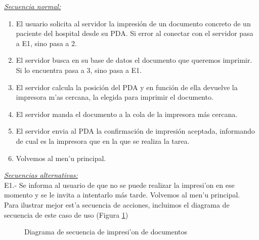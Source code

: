 \emph{\underline{Secuencia normal:}} 
\begin{enumerate}
\item El usuario solicita al servidor la impresi\'on de un documento concreto de un paciente del hospital desde su PDA. Si error al conectar con el servidor pasa a E1, sino pasa a 2.
\item El servidor busca en su base de datos el documento que queremos imprimir. Si lo encuentra pasa a 3, sino pasa a E1.
\item El servidor calcula la posici\'on del PDA y en funci\'on de ella devuelve la impresora m'as cercana,  la elegida para imprimir el documento.
\item El servidor manda el documento a la cola de la impresora m\'as cercana.
\item El servidor envia al PDA la confirmaci\'on de impresi\'on aceptada, informando de cual es la impresora que en la que se realiza la tarea.
\item Volvemos al men'u principal.
\end{enumerate}

\emph{\underline{Secuencias alternativas:}}\bigskip \\E1.- Se informa al usuario de que no se puede realizar la impresi'on en ese momento y se le invita a intentarlo m\'as tarde. Volvemos al men'u principal.\bigskip \\ Para ilustrar mejor est'a secuencia de acciones, incluimos el diagrama de secuencia de este caso de uso (Figura \ref{fig:cu_imprimir})

\begin{figure}[h!]
	\begin{center}
     	\end{center}
    	\caption{Diagrama de secuencia de impresi'on de documentos}\label{fig:cu_imprimir}
\end{figure}